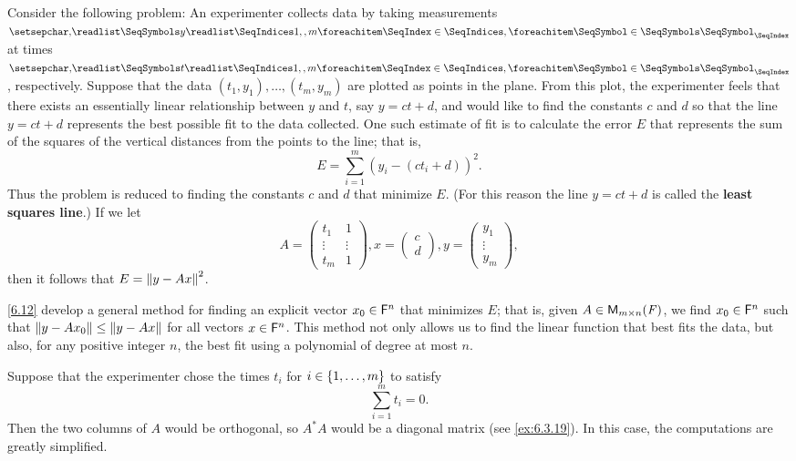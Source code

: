 \begin{note}
  Consider the following problem:
  An experimenter collects data by taking measurements \(\seq{y}{1,,m}\) at times \(\seq{t}{1,,m}\), respectively.
  Suppose that the data \((t_1, y_1), \dots, (t_m, y_m)\) are plotted as points in the plane.
  From this plot, the experimenter feels that there exists an essentially linear relationship between \(y\) and \(t\), say \(y = ct + d\), and would like to find the constants \(c\) and \(d\) so that the line \(y = ct + d\) represents the best possible fit to the data collected.
  One such estimate of fit is to calculate the error \(E\) that represents the sum of the squares of the vertical distances from the points to the line;
  that is,
  \[
    E = \sum_{i = 1}^m (y_i - (c t_i + d))^2.
  \]
  Thus the problem is reduced to finding the constants \(c\) and \(d\) that minimize \(E\).
  (For this reason the line \(y = ct + d\) is called the \textbf{least squares line}.)
  If we let
  \[
    A = \begin{pmatrix}
      t_1    & 1      \\
      \vdots & \vdots \\
      t_m    & 1
    \end{pmatrix}, x = \begin{pmatrix}
      c \\
      d
    \end{pmatrix}, y = \begin{pmatrix}
      y_1    \\
      \vdots \\
      y_m
    \end{pmatrix},
  \]
  then it follows that \(E = \left\lVert y - Ax\right\rVert^2\).

  \cref{6.12} develop a general method for finding an explicit vector \(x_0 \in \mathsf{F}^n\) that minimizes \(E\);
  that is, given \(A \in \mathsf{M}_{{m} \times n}({\mathit{F}})\), we find \(x_0 \in \mathsf{F}^n\) such that \(\left\lVert y - A x_0\right\rVert \leq \left\lVert y - Ax\right\rVert\) for all vectors \(x \in \mathsf{F}^n\).
  This method not only allows us to find the linear function that best fits the data, but also, for any positive integer \(n\), the best fit using a polynomial of degree at most \(n\).

  Suppose that the experimenter chose the times \(t_i\) for \(i \in \left\lbrace1, \dots, m\right\rbrace\) to satisfy
  \[
    \sum_{i = 1}^m t_i = 0.
  \]
  Then the two columns of \(A\) would be orthogonal, so \(A^* A\) would be a diagonal matrix (see \cref{ex:6.3.19}).
  In this case, the computations are greatly simplified.


\end{note}

